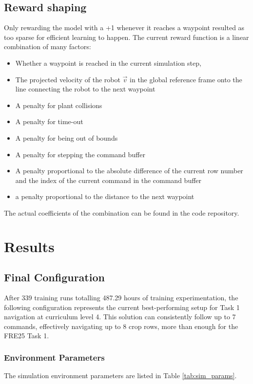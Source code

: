 \documentclass[11pt,a4paper,twocolumn]{article}
\begin{document}
\subsection{Reward shaping}
Only rewarding the model with a +1 whenever it reaches a waypoint resulted as too sparse for efficient learning to happen. The current reward function is a linear combination of many factors:
\begin{itemize}
    \item Whether a waypoint is reached in the current simulation step,
    \item The projected velocity of the robot $\vec{v}$ in the global reference frame onto the line connecting the robot to the next waypoint 
    \item A penalty for plant collisions
    \item A penalty for time-out
    \item A penalty for being out of bounds
    \item A penalty for stepping the command buffer
    \item A penalty proportional to the absolute difference of the current row number and the index of the current command in the command buffer
    \item a penalty proportional to the distance to the next waypoint
    
\end{itemize}

The actual coefficients of the combination can be found in the code repository.

\section{Results}

\subsection{Final Configuration}
After 339 training runs totalling 487.29 hours of training experimentation, the following configuration represents the current best-performing setup for Task 1 navigation at curriculum level 4. This solution can consistently follow up to 7 commands, effectively navigating up to 8 crop rows, more than enough for the FRE25 Task 1.

\subsubsection{Environment Parameters}
The simulation environment parameters are listed in Table \ref{tab:sim_params}.
\end{document}
